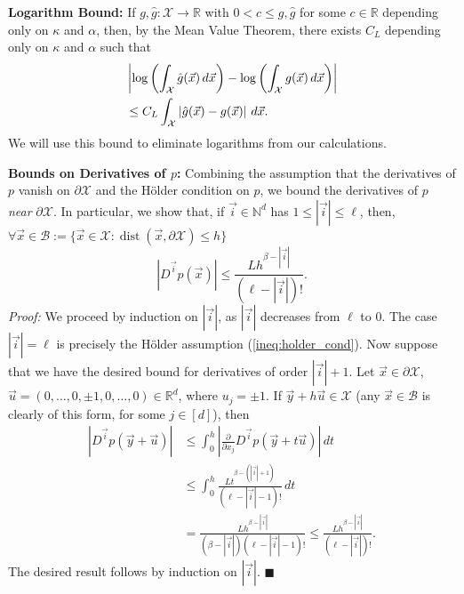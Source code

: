 \documentclass{article}
\renewcommand{\qed}{\quad \ensuremath{\blacksquare}}    %
\newcommand{\N}{\mathbb{N}}                         %
\newcommand{\R}{\mathbb{R}}                         %
\newcommand{\X}{\mathcal{X}}                        %
\newcommand{\vx}{\vec{x}}                           %
\newcommand{\vy}{\vec{y}}                           %
\newcommand{\vu}{\vec{u}}                           %
\newcommand{\vi}{{\vec{i}}}                         %
\newcommand{\dist}{\operatorname{dist}}             %
\newcommand{\B}{\mathcal{B}}                        %
\begin{document}
{\bf Logarithm Bound:} If $g,\hat g : \X \to \R$ with $0 < c \leq g,\hat g$ for
some $c \in \R$ depending only on $\kappa$ and $\alpha$, then, by the Mean
Value Theorem, there exists $C_L$ depending only on $\kappa$ and $\alpha$ such
that
\begin{align}
\notag
 & \left| \log \left( \int_\X \hat g(\vx) \, d\vx \right)
        - \log \left( \int_\X g(\vx) \, d\vx \right) \right|        \\
\label{ineq:log}
 & \leq C_L \int_\X \left| \hat g(\vx) - g(\vx) \right| \, d\vx.
\end{align}
We will use this bound to eliminate logarithms from our calculations.

{\bf Bounds on Derivatives of $p$:}
Combining the assumption that the derivatives of $p$ vanish on $\partial \X$
and the H\"{o}lder condition on $p$, we bound the derivatives of $p$
\emph{near} $\partial \X$. In particular, we show that, if $\vi \in \N^d$
has $1 \leq |\vi| \leq \ell$, then,
$\forall \vx \in \B := \{\vx \in \X : \dist(\vx,\partial \X) \leq h\}$
\begin{equation}
\label{ineq:p_boundary_parts}
|D^\vi p(\vx)|
    \leq \frac{Lh^{\beta - |\vi|}}{(\ell - |\vi|)!}.
\end{equation}
\emph{Proof:} We proceed by induction on $|\vi|$, as $|\vi|$ decreases from
$\ell$ to $0$. The case $|\vi| = \ell$ is precisely the H\"{o}lder assumption
(\ref{ineq:holder_cond}). Now suppose that we have the desired bound for
derivatives of order $|\vi| + 1$. Let
$\vx \in \partial \X$, $\vu = (0,\dots,0,\pm1,0,\dots,0) \in \R^d$, where
$u_j = \pm1$. If $\vy + h\vu \in \X$ (any $\vx \in \B$ is clearly of this form,
for some $j \in [d]$), then
\begin{align*}
|D^\vi p(\vy + \vu)|
 & \leq \int_0^h \left| \frac{\partial}{\partial x_j}
                    D^\vi p(\vy + t\vu) \right| \, dt            \\
 & \leq \int_0^h \frac{Lt^{\beta - (|\vi| + 1)}}{(\ell - |\vi| - 1)!} \, dt    \\
 & = \frac{Lh^{\beta - |\vi|}}{(\beta - |\vi|)(\ell - |\vi| - 1)!}
   \leq \frac{Lh^{\beta - |\vi|}}{(\ell - |\vi|)!}.
\end{align*}
The desired result follows by induction on $|\vi|$. \qed
\end{document}
